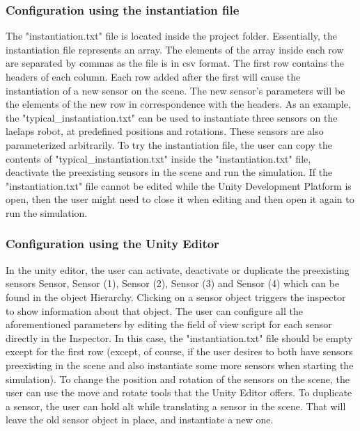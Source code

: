 \documentclass{article}
\begin{document}
\subsubsection{Configuration using the instantiation file}

The "instantiation.txt" file is located inside the project folder. Essentially, the instantiation file represents an array. The elements of the array inside each row are separated by commas as the file is in csv format. The first row contains the headers of each column. Each row added after the first will cause the instantiation of a new sensor on the scene. The new sensor's parameters will be the elements of the new row in correspondence with the headers. As an example, the "typical\_instantiation.txt" can be used to instantiate three sensors on the laelaps robot, at predefined positions and rotations. These sensors are also parameterized arbitrarily. To try the instantiation file, the user can copy the contents of "typical\_instantiation.txt" inside the "instantiation.txt" file, deactivate the preexisting sensors in the scene and run the simulation. If the "instantiation.txt" file cannot be edited while the Unity Development Platform is open, then the user might need to close it when editing and then open it again to run the simulation. 


\subsubsection{Configuration using the Unity Editor}

In the unity editor, the user can activate, deactivate or duplicate the preexisting sensors Sensor, Sensor (1), Sensor (2), Sensor (3) and Sensor (4) which can be found in the object Hierarchy. Clicking on a sensor object triggers the inspector to show information about that object. The user can configure all the aforementioned parameters by editing the field of view script for each sensor directly in the Inspector. In this case, the "instantiation.txt" file should be empty except for the first row (except, of course, if the user desires to both have sensors preexisting in the scene and also instantiate some more sensors when starting the simulation). To change the position and rotation of the sensors on the scene, the user can use the move and rotate tools that the Unity Editor offers. To duplicate a sensor, the user can hold alt while translating a sensor in the scene. That will leave the old sensor object in place, and instantiate a new one. 
\end{document}
